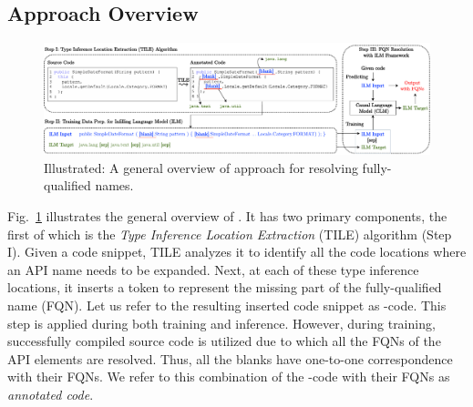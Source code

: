 \subsection{Approach Overview}
\label{sec:overview}

\begin{figure}[t]
 \centering
 \includegraphics[width=.98\textwidth]{overview-ilm-2.pdf}
 \caption{Illustrated: A general overview of \tool approach for resolving fully-qualified names.}
 \label{fig:approach}
\end{figure}


Fig.~\ref{fig:approach} illustrates the general overview of
{\tool}. It has two primary components, the first of which is the {\em
  Type Inference Location Extraction} (TILE) algorithm (Step I). Given
a code snippet, TILE analyzes it to identify all the code locations
where an API name needs to be expanded. Next, at each of these type
inference locations, it inserts a \blank token to represent
the missing part of the fully-qualified name (FQN). Let us refer to
the resulting \blank inserted code snippet as
\blank-code. This step is applied during both training and
inference. However, during training, successfully compiled source code is 
utilized due to which all the FQNs of the API elements are resolved. 
Thus, all the blanks have one-to-one correspondence with their FQNs. We
refer to this combination of the \blank-code with their FQNs as {\em annotated code}.

